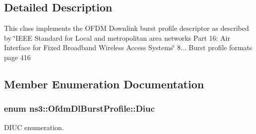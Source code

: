 \subsection{Detailed Description}
This class implements the O\+F\+DM Downlink burst profile descriptor as described by \char`\"{}\+I\+E\+E\+E Standard for
\+Local and metropolitan area networks Part 16\+: Air Interface for Fixed Broadband Wireless Access Systems\char`\"{} 8... Burst profile formats page 416 

\subsection{Member Enumeration Documentation}
\subsubsection[{\texorpdfstring{Diuc}{Diuc}}]{\setlength{\rightskip}{0pt plus 5cm}enum {\bf ns3\+::\+Ofdm\+Dl\+Burst\+Profile\+::\+Diuc}}\hypertarget{classns3_1_1OfdmDlBurstProfile_a4769c73985bf918ecd21180081471a00}{}\label{classns3_1_1OfdmDlBurstProfile_a4769c73985bf918ecd21180081471a00}


D\+I\+UC enumeration. 

